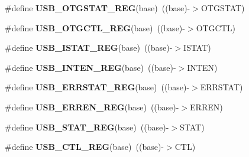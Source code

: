 \begin{DoxyCompactItemize}
\item 
\#define {\bfseries U\+S\+B\+\_\+\+O\+T\+G\+S\+T\+A\+T\+\_\+\+R\+EG}(base)~((base)-\/$>$O\+T\+G\+S\+T\+AT)\hypertarget{group__USB__Register__Accessor__Macros_gad50d4233733a0ec8cd3f8bd835aeb9fa}{}\label{group__USB__Register__Accessor__Macros_gad50d4233733a0ec8cd3f8bd835aeb9fa}

\item 
\#define {\bfseries U\+S\+B\+\_\+\+O\+T\+G\+C\+T\+L\+\_\+\+R\+EG}(base)~((base)-\/$>$O\+T\+G\+C\+TL)\hypertarget{group__USB__Register__Accessor__Macros_ga173b94208c5770ddcb9f9fb76c77d6a6}{}\label{group__USB__Register__Accessor__Macros_ga173b94208c5770ddcb9f9fb76c77d6a6}

\item 
\#define {\bfseries U\+S\+B\+\_\+\+I\+S\+T\+A\+T\+\_\+\+R\+EG}(base)~((base)-\/$>$I\+S\+T\+AT)\hypertarget{group__USB__Register__Accessor__Macros_ga0f24e60354c45e02ee9702596e4a5878}{}\label{group__USB__Register__Accessor__Macros_ga0f24e60354c45e02ee9702596e4a5878}

\item 
\#define {\bfseries U\+S\+B\+\_\+\+I\+N\+T\+E\+N\+\_\+\+R\+EG}(base)~((base)-\/$>$I\+N\+T\+EN)\hypertarget{group__USB__Register__Accessor__Macros_ga8edd1b1424a6e18f6fe2cd1cbfb886ba}{}\label{group__USB__Register__Accessor__Macros_ga8edd1b1424a6e18f6fe2cd1cbfb886ba}

\item 
\#define {\bfseries U\+S\+B\+\_\+\+E\+R\+R\+S\+T\+A\+T\+\_\+\+R\+EG}(base)~((base)-\/$>$E\+R\+R\+S\+T\+AT)\hypertarget{group__USB__Register__Accessor__Macros_ga5dcfe1e668621d53983d793d1a2f8abd}{}\label{group__USB__Register__Accessor__Macros_ga5dcfe1e668621d53983d793d1a2f8abd}

\item 
\#define {\bfseries U\+S\+B\+\_\+\+E\+R\+R\+E\+N\+\_\+\+R\+EG}(base)~((base)-\/$>$E\+R\+R\+EN)\hypertarget{group__USB__Register__Accessor__Macros_ga8128051a5240f8bc046e31d405c67947}{}\label{group__USB__Register__Accessor__Macros_ga8128051a5240f8bc046e31d405c67947}

\item 
\#define {\bfseries U\+S\+B\+\_\+\+S\+T\+A\+T\+\_\+\+R\+EG}(base)~((base)-\/$>$S\+T\+AT)\hypertarget{group__USB__Register__Accessor__Macros_ga7c8ccd47cc8588700bdbd358f4c8e33f}{}\label{group__USB__Register__Accessor__Macros_ga7c8ccd47cc8588700bdbd358f4c8e33f}

\item 
\#define {\bfseries U\+S\+B\+\_\+\+C\+T\+L\+\_\+\+R\+EG}(base)~((base)-\/$>$C\+TL)\hypertarget{group__USB__Register__Accessor__Macros_gaf84a262dc6242d1a0f3b47186de660e7}{}\label{group__USB__Register__Accessor__Macros_gaf84a262dc6242d1a0f3b47186de660e7}


\end{DoxyCompactItemize}
